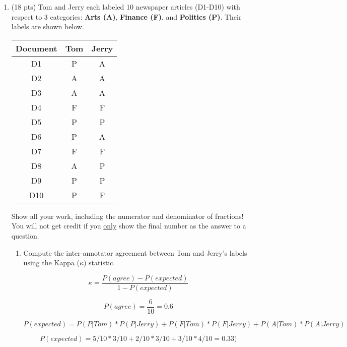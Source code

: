 \documentclass[11pt]{article}
\begin{document}
\begin{enumerate}
\begin{enumerate}
\begin{enumerate}
    \end{enumerate} 

\end{enumerate}


\newpage

\item (18 pts) Tom and Jerry each labeled 10 newspaper articles
  (D1-D10) with respect to 3 categories: {\bf Arts (A)}, {\bf
    Finance (F)}, and {\bf Politics (P)}. Their labels are shown
  below.

\begin{center}
\begin{tabular}{|c|cc|} \hline
{\bf Document} & {\bf Tom} & {\bf Jerry} \\ \hline
D1 & P & A \\ \hline
D2 & A & A \\ \hline
D3 & A & A \\ \hline
D4 & F & F \\ \hline
D5 & P & P \\ \hline
D6 & P & A \\ \hline
D7 & F & F \\ \hline
D8 & A & P \\ \hline
D9 & P & P \\ \hline
D10 & P & F \\ \hline
\end{tabular}
\end{center}

\vspace*{.1in}
Show all your work, including the numerator and denominator of
fractions! You will not get credit if you \underline{only} show the final number
as the answer to a question.

\begin{enumerate}
\item Compute the inter-annotator agreement between Tom and Jerry's
  labels using the Kappa ($\kappa$) statistic. 
  
  $$\kappa = \frac{P(agree) - P(expected)}{1 - P(expected)} $$
  
  $$P(agree) = \frac{6}{10} = 0.6$$
  
  $$P(expected) = P(P|Tom) * P(P|Jerry) + P(F|Tom) * P(F|Jerry) + P(A|Tom) * P(A|Jerry)$$
  
  $$P(expected) = 5/10 * 3/10 + 2/10 * 3/10 + 3/10 * 4/10 = 0.33)$$
  

\end{enumerate}
\end{enumerate}
\end{document}
